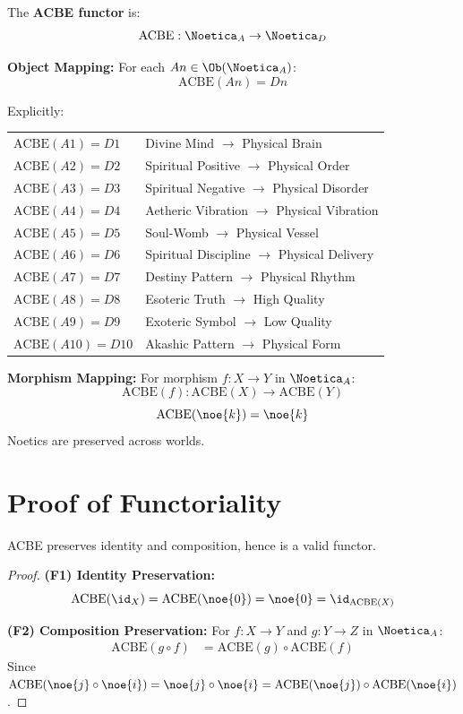 \begin{definition}
\label{def:acbe-functor}
The \textbf{ACBE functor} is:
\[
\mathrm{ACBE} : \Noetica_A \to \Noetica_D
\]

\textbf{Object Mapping:}
For each $An \in \Ob(\Noetica_A)$:
\[
\mathrm{ACBE}(An) = Dn
\]

Explicitly:
\begin{center}
\begin{tabular}{ll}
$\mathrm{ACBE}(A1) = D1$ & Divine Mind $\to$ Physical Brain \\
$\mathrm{ACBE}(A2) = D2$ & Spiritual Positive $\to$ Physical Order \\
$\mathrm{ACBE}(A3) = D3$ & Spiritual Negative $\to$ Physical Disorder \\
$\mathrm{ACBE}(A4) = D4$ & Aetheric Vibration $\to$ Physical Vibration \\
$\mathrm{ACBE}(A5) = D5$ & Soul-Womb $\to$ Physical Vessel \\
$\mathrm{ACBE}(A6) = D6$ & Spiritual Discipline $\to$ Physical Delivery \\
$\mathrm{ACBE}(A7) = D7$ & Destiny Pattern $\to$ Physical Rhythm \\
$\mathrm{ACBE}(A8) = D8$ & Esoteric Truth $\to$ High Quality \\
$\mathrm{ACBE}(A9) = D9$ & Exoteric Symbol $\to$ Low Quality \\
$\mathrm{ACBE}(A10) = D10$ & Akashic Pattern $\to$ Physical Form \\
\end{tabular}
\end{center}

\textbf{Morphism Mapping:}
For morphism $f : X \to Y$ in $\Noetica_A$:
\[
\mathrm{ACBE}(f) : \mathrm{ACBE}(X) \to \mathrm{ACBE}(Y)
\]
\[
\mathrm{ACBE}(\noe{k}) = \noe{k}
\]
Noetics are preserved across worlds.
\end{definition}

\section{Proof of Functoriality}

\begin{theorem}
\label{thm:acbe-functor}
ACBE preserves identity and composition, hence is a valid functor.
\end{theorem}

\begin{proof}
\textbf{(F1) Identity Preservation:}
\[
\mathrm{ACBE}(\id_X) = \mathrm{ACBE}(\noe{0}) = \noe{0} = \id_{\mathrm{ACBE}(X)}
\]

\textbf{(F2) Composition Preservation:}
For $f : X \to Y$ and $g : Y \to Z$ in $\Noetica_A$:
\begin{align}
\mathrm{ACBE}(g \circ f) &= \mathrm{ACBE}(g) \circ \mathrm{ACBE}(f)
\end{align}
Since $\mathrm{ACBE}(\noe{j} \circ \noe{i}) = \noe{j} \circ \noe{i} = \mathrm{ACBE}(\noe{j}) \circ \mathrm{ACBE}(\noe{i})$.
\end{proof}

